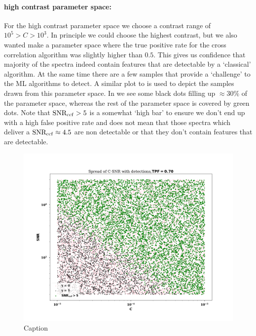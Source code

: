 \paragraph{high contrast parameter space:\\}
For the high contrast parameter space we choose a contrast range of $10^{5}>C>10^{3}$. 
In principle we could choose the highest contrast, but we also wanted make a parameter space where the true positive rate for the cross correlation algorithm was slightly higher than $0.5$.
This gives us confidence that majority of the spectra indeed contain features that are detectable by a `classical' algorithm. 
At the same time there are a few samples that provide a `challenge' to the ML algorithms to detect.
A similar plot to  is used to depict the samples drawn from this parameter space.
In  we see some black dots filling up $\approx 30\%$ of the parameter space, whereas the rest of the parameter space is covered by green dots.
Note that $\rm{SNR_{ccf}}>5$ is a somewhat `high bar' to ensure we don't end up with a high false positive rate and does not mean that those spectra which deliver a $\rm{SNR_{ccf}}\approx 4.5$ are non detectable or that they don't contain features that are detectable.
\begin{figure}
    \centering
    \includegraphics[scale=0.4]{images/Chapter3/samples_nontrained.png}
    \caption{Caption}
    \label{fig:untrained_sample space}
\end{figure}


